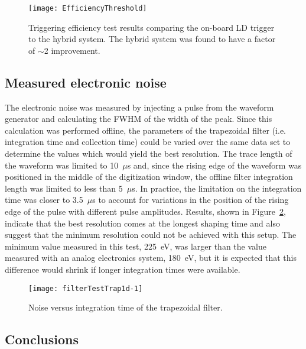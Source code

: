 			\begin{figure}
				\centering
				\texttt{[image: EfficiencyThreshold]}
				\caption[Triggering efficiency test results]
				{Triggering efficiency test results comparing the on-board LD trigger to the 
				hybrid system.  The hybrid system was found to have a factor of $\sim$2 improvement.}
				\label{fig:PPC2TriggeringEfficiencyTests}
			\end{figure}

		\subsection{Measured electronic noise}
		\label{sec:DeploymentPPC2SoudanAnalysisElectronicNoise}    
	
	The electronic noise was measured by injecting a pulse from the waveform generator and calculating the FWHM of the width of the peak.  Since this calculation was performed offline, the parameters of the trapezoidal filter (i.e. integration time and collection time) could be varied over the same data set to determine the values which would yield the best resolution.  The trace length of the waveform was limited to 10~$\mu$s and, since the rising edge of the waveform was positioned in the middle of the digitization window, the offline filter integration length was limited to less than 5~$\mu$s.  In practice, the limitation on the integration time was closer to 3.5~$\mu$s to account for variations in the position of the rising edge of the pulse with different pulse amplitudes.  Results, shown in Figure~\ref{fig:PPC2NoiseVsIntegrationTime}, indicate that the best resolution comes at the longest shaping time and also suggest that the minimum resolution could not be achieved with this setup.  The minimum value measured in this test, 225~eV, was larger than the value measured with an analog electronics system, 180~eV, but it is expected that this difference would shrink if longer integration times were available.
	
				\begin{figure}
					\centering
					\texttt{[image: filterTestTrap1d-1]}
					\caption[Noise versus integration time of the trapezoidal filter]
					{Noise versus integration time of the trapezoidal filter.}
					\label{fig:PPC2NoiseVsIntegrationTime}
				\end{figure}
		
		\subsection{Conclusions}
	
